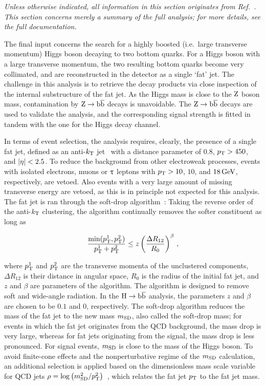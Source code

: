 \emph{%
Unless otherwise indicated, all information in this section originates from Ref.~\cite{Sirunyan:2017dgc}. This section concerns merely a summary of the full analysis; for more details, see the full documentation.
}

The final input concerns the search for a highly boosted (i.e.\ large transverse momentum) Higgs boson decaying to two bottom quarks.
% 
For a Higgs boson with a large transverse momentum, the two resulting bottom quarks become very collimated, and are reconstructed in the detector as a single `fat' jet.
% 
The challenge in this analysis is to retrieve the decay products via close inspection of the internal substructure of the fat jet.
% 
As the Higgs mass is close to the $\mathrm{Z}$ boson mass, contamination by $\mathrm{Z}\to\mathrm{b}\overline{\mathrm{b}}$ decays is unavoidable.
% 
The $\mathrm{Z}\to\mathrm{b}\overline{\mathrm{b}}$ decays are used to validate the analysis, and the corresponding signal strength is fitted in tandem with the one for the Higgs decay channel.


In terms of event selection, the analysis requires, clearly, the presence of a single fat jet, defined as an anti-$k_\mathrm{T}$ jet~\cite{Cacciari:2008gp} with a distance parameter of $0.8$, $p_\mathrm{T} > 450$\GeV, and $\left| \eta \right |<2.5$.
% 
To reduce the background from other electroweak processes, events with isolated electrons, muons or $\uptau$ leptons with $p_\mathrm{T} > 10$, $10$, and $18\,\text{GeV}$, respectively, are vetoed.
% 
Also events with a very large amount of missing transverse energy are vetoed, as this is in principle not expected for this analysis.
% 
The fat jet is ran through the soft-drop algorithm~\cite{Dasgupta:2013ihk,Larkoski:2014wba}: Taking the reverse order of the anti-$k_\mathrm{T}$ clustering, the algorithm continually removes the softer constituent as long as
% 
\begin{linenomath*}
\begin{equation}
\frac{ \text{min}( p_\mathrm{T}^1, p_\mathrm{T}^2 ) }{ p_\mathrm{T}^1 + p_\mathrm{T}^2 }
    \leq
    z \left( \frac{\Delta R_{12}}{R_0} \right)^\beta
\,,
\end{equation}
\end{linenomath*}
% 
where $p_\mathrm{T}^1$ and $p_\mathrm{T}^2$ are the transverse momenta of the unclustered components, $\Delta R_{12}$ is their distance in angular space, $R_0$ is the radius of the initial fat jet, and $z$ and $\beta$ are parameters of the algorithm.
% 
The algorithm is designed to remove soft and wide-angle radiation.
% 
In the $\mathrm{H}\to\mathrm{b}\overline{\mathrm{b}}$ analysis, the parameters $z$ and $\beta$ are chosen to be $0.1$ and $0$, respectively.
% 
The soft-drop algorithm reduces the mass of the fat jet to the new mass $m_\mathrm{SD}$, also called the soft-drop mass; for events in which the fat jet originates from the QCD background, the mass drop is very large, whereas for fat jets originating from the signal, the mass drop is less pronounced.
% 
For signal events, $m_\mathrm{SD}$ is close to the mass of the Higgs boson.
% 
To avoid finite-cone effects and the nonperturbative regime of the $m_\mathrm{SD}$ calculation, an additional selection is applied based on the dimensionless mass scale variable for QCD jets $\rho=\log\left(m_\mathrm{SD}^2/p_\mathrm{T}^2\right)$~\cite{Dasgupta:2013ihk}, which relates the fat jet $p_\mathrm{T}$ to the fat jet mass.


